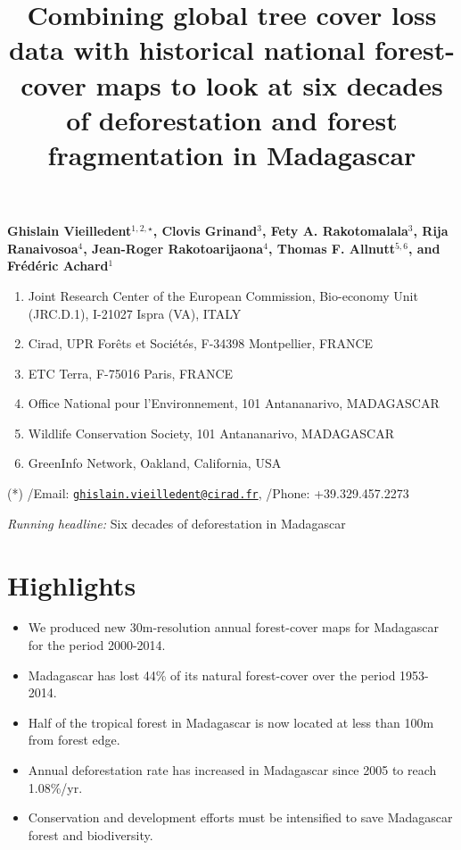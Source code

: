 \documentclass[]{article}
\title{Combining global tree cover loss data with historical national
forest-cover maps to look at six decades of deforestation and forest
fragmentation in Madagascar}
\author{}
\date{}
\providecommand{\tightlist}{%
  \setlength{\itemsep}{0pt}\setlength{\parskip}{0pt}}
\theoremstyle{definition}
\theoremstyle{definition}
\theoremstyle{definition}
\theoremstyle{remark}
\begin{document}
\maketitle

\textbf{Ghislain Vieilledent\(^{1,2,\star}\), Clovis Grinand\(^{3}\),
Fety A. Rakotomalala\(^{3}\), Rija Ranaivosoa\(^{4}\), Jean-Roger
Rakotoarijaona\(^{4}\), Thomas F. Allnutt\(^{5,6}\), and Frédéric
Achard\(^{1}\)}

\begin{enumerate}
\def\labelenumi{\arabic{enumi}.}
\tightlist
\item
  Joint Research Center of the European Commission, Bio-economy Unit
  (JRC.D.1), I-21027 Ispra (VA), ITALY
\item
  Cirad, UPR Forêts et Sociétés, F-34398 Montpellier, FRANCE
\item
  ETC Terra, F-75016 Paris, FRANCE
\item
  Office National pour l'Environnement, 101 Antananarivo, MADAGASCAR
\item
  Wildlife Conservation Society, 101 Antananarivo, MADAGASCAR
\item
  GreenInfo Network, Oakland, California, USA
\end{enumerate}

(*) /Email:
\href{mailto:ghislain.vieilledent@cirad.fr}{\nolinkurl{ghislain.vieilledent@cirad.fr}},
/Phone: +39.329.457.2273

\emph{Running headline:} Six decades of deforestation in Madagascar

\hypertarget{highlights}{%
\section{Highlights}\label{highlights}}

\begin{itemize}
\tightlist
\item
  We produced new 30m-resolution annual forest-cover maps for Madagascar
  for the period 2000-2014.
\item
  Madagascar has lost 44\% of its natural forest-cover over the period
  1953-2014.
\item
  Half of the tropical forest in Madagascar is now located at less than
  100m from forest edge.
\item
  Annual deforestation rate has increased in Madagascar since 2005 to
  reach 1.08\%/yr.
\item
  Conservation and development efforts must be intensified to save
  Madagascar forest and biodiversity.
\end{itemize}
\end{document}
